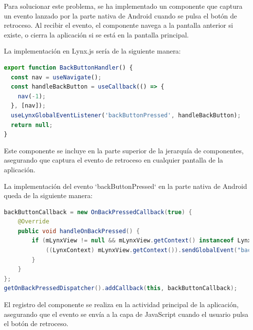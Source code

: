 Para solucionar este problema, se ha implementado un componente que captura un evento lanzado por la parte nativa de Android cuando se pulsa el botón de retroceso.
Al recibir el evento, el componente navega a la pantalla anterior si existe, o cierra la aplicación si se está en la pantalla principal.

La implementación en Lynx.js sería de la siguiente manera:
\begin{lstlisting}[language=typescript, caption={Implementación del botón de retroceso en Lynx.js}]
export function BackButtonHandler() {
  const nav = useNavigate();
  const handleBackButton = useCallback(() => {
    nav(-1);
  }, [nav]);
  useLynxGlobalEventListener('backButtonPressed', handleBackButton);
  return null;
}
\end{lstlisting}
Este componente se incluye en la parte superior de la jerarquía de componentes, asegurando que captura el evento de retroceso en cualquier pantalla de la aplicación.

La implementación del evento `backButtonPressed` en la parte nativa de Android queda de la siguiente manera:
\begin{lstlisting}[language=Java, caption={Implementación del evento de botón de retroceso en Android}]
backButtonCallback = new OnBackPressedCallback(true) {
    @Override
    public void handleOnBackPressed() {
        if (mLynxView != null && mLynxView.getContext() instanceof LynxContext) {
            ((LynxContext) mLynxView.getContext()).sendGlobalEvent("backButtonPressed", null);
        }
    }
};
getOnBackPressedDispatcher().addCallback(this, backButtonCallback);
\end{lstlisting}
El registro del componente se realiza en la actividad principal de la aplicación, asegurando que el evento se envía a la capa de JavaScript cuando el usuario pulsa el botón de retroceso.
